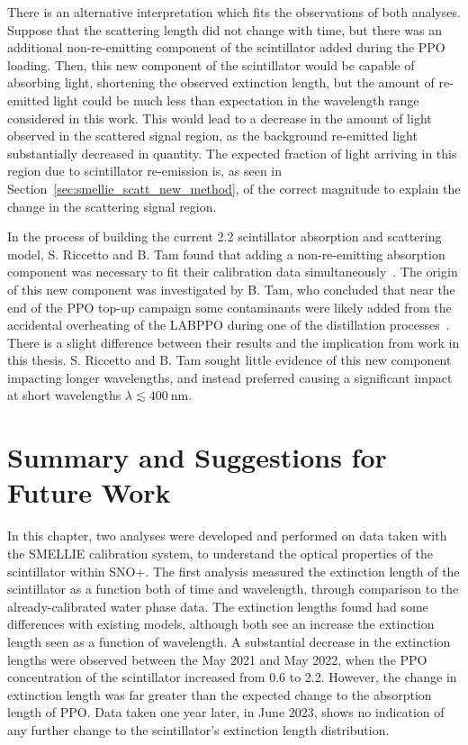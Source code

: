 There is an alternative interpretation which fits the observations of both analyses. Suppose that the scattering length did not change with time, but there was an additional non-re-emitting component of the scintillator added during the PPO loading. Then, this new component of the scintillator would be capable of absorbing light, shortening the observed extinction length, but the amount of re-emitted light could be much less than expectation in the wavelength range considered in this work. This would lead to a decrease in the amount of light observed in the scattered signal region, as the background re-emitted light substantially decreased in quantity. The expected fraction of light arriving in this region due to scintillator re-emission is, as seen in Section~\ref{sec:smellie_scatt_new_method}, of the correct magnitude to explain the change in the scattering signal region.

In the process of building the current \SI{2.2}{\gpl} scintillator absorption and scattering model, S. Riccetto and B. Tam found that adding a non-re-emitting absorption component was necessary to fit their calibration data simultaneously~\cite{kaptanogluDocumentationAttenuationStudies2022}. %
The origin of this new component was investigated by B. Tam, who concluded that near the end of the PPO top-up campaign some contaminants were likely added from the accidental overheating of the LABPPO during one of the distillation processes~\cite{tamAttenuationMeasurements2022}. %
There is a slight difference between their results and the implication from work in this thesis. S. Riccetto and B. Tam sought little evidence of this new component impacting longer wavelengths, and instead preferred causing a significant impact at short wavelengths $\lambda\lesssim\SI{400}{\nm}$.

\section{Summary and Suggestions for Future Work}
In this chapter, two analyses were developed and performed on data taken with the SMELLIE calibration system, to understand the optical properties of the scintillator within SNO+. The first analysis measured the extinction length of the scintillator as a function both of time and wavelength, through comparison to the already-calibrated water phase data. The extinction lengths found had some differences with existing models, although both see an increase the extinction length seen as a function of wavelength. A substantial decrease in the extinction lengths were observed between the May 2021 and May 2022, when the PPO concentration of the scintillator increased from \SI{0.6}{\gpl} to \SI{2.2}{\gpl}. However, the change in extinction length was far greater than the expected change to the absorption length of PPO. Data taken one year later, in June 2023, shows no indication of any further change to the scintillator's extinction length distribution.

